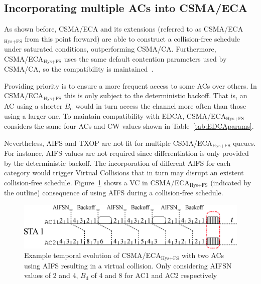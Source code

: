 
\subsection{Incorporating multiple ACs into CSMA/ECA}
As shown before, CSMA/ECA and its extensions (referred to as CSMA/ECA$_{\text{Hys+FS}}$ from this point forward) are able to construct a collision-free schedule under saturated conditions, outperforming CSMA/CA. Furthermore, CSMA/ECA$_{\text{Hys+FS}}$ uses the same default contention parameters used by CSMA/CA, so the compatibility is maintained~\cite{sanabria2014high}.

Providing priority is to ensure a more frequent access to some ACs over others. In CSMA/ECA$_{\text{Hys+FS}}$ this is only subject to the deterministic backoff. That is, an AC using a shorter $B_{\text{d}}$ would in turn access the channel more often than those using a larger one. To maintain compatibility with EDCA, CSMA/ECA$_{\text{Hys+FS}}$ considers the same four ACs and CW values shown in Table~\ref{tab:EDCAparams}. 

Nevertheless, AIFS and TXOP are not fit for multiple CSMA/ECA$_{\text{Hys+FS}}$ queues. For instance, AIFS values are not required since differentiation is only provided by the deterministic backoff. The incorporation of different AIFS for each category would trigger Virtual Collisions that in turn may disrupt an existent collision-free schedule. Figure~\ref{fig:AIFSinECA} shows a VC in CSMA/ECA$_{\text{Hys+FS}}$ (indicated by the outline) consequence of using AIFS during a collision-free schedule.

	\begin{figure}[tb]
	\centering
		\includegraphics[width=\linewidth]{figures/AIFSwithECA.eps}
		\caption{Example temporal evolution of CSMA/ECA$_{\text{Hys+FS}}$ with two ACs using AIFS resulting in a virtual collision. Only considering AIFSN values of 2 and 4, $B_{\text{d}}$ of 4 and 8 for AC1 and AC2 respectively}
		\label{fig:AIFSinECA}
	\end{figure}


